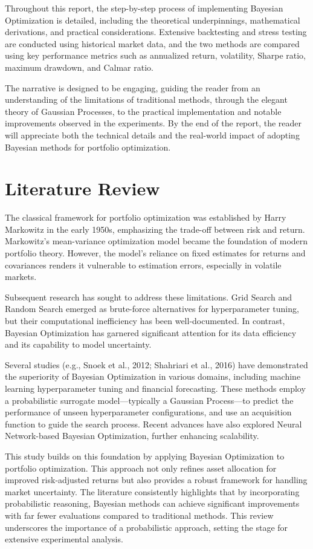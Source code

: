 \documentclass[a4paper,12pt]{article}
\begin{document}
Throughout this report, the step-by-step process of implementing Bayesian Optimization is detailed, including the theoretical underpinnings, mathematical derivations, and practical considerations. Extensive backtesting and stress testing are conducted using historical market data, and the two methods are compared using key performance metrics such as annualized return, volatility, Sharpe ratio, maximum drawdown, and Calmar ratio.

The narrative is designed to be engaging, guiding the reader from an understanding of the limitations of traditional methods, through the elegant theory of Gaussian Processes, to the practical implementation and notable improvements observed in the experiments. By the end of the report, the reader will appreciate both the technical details and the real-world impact of adopting Bayesian methods for portfolio optimization.

\section{Literature Review}
The classical framework for portfolio optimization was established by Harry Markowitz in the early 1950s, emphasizing the trade-off between risk and return. Markowitz’s mean-variance optimization model became the foundation of modern portfolio theory. However, the model's reliance on fixed estimates for returns and covariances renders it vulnerable to estimation errors, especially in volatile markets.

Subsequent research has sought to address these limitations. Grid Search and Random Search emerged as brute-force alternatives for hyperparameter tuning, but their computational inefficiency has been well-documented. In contrast, Bayesian Optimization has garnered significant attention for its data efficiency and its capability to model uncertainty.

Several studies (e.g., Snoek et al., 2012; Shahriari et al., 2016) have demonstrated the superiority of Bayesian Optimization in various domains, including machine learning hyperparameter tuning and financial forecasting. These methods employ a probabilistic surrogate model---typically a Gaussian Process---to predict the performance of unseen hyperparameter configurations, and use an acquisition function to guide the search process. Recent advances have also explored Neural Network-based Bayesian Optimization, further enhancing scalability.

This study builds on this foundation by applying Bayesian Optimization to portfolio optimization. This approach not only refines asset allocation for improved risk-adjusted returns but also provides a robust framework for handling market uncertainty. The literature consistently highlights that by incorporating probabilistic reasoning, Bayesian methods can achieve significant improvements with far fewer evaluations compared to traditional methods. This review underscores the importance of a probabilistic approach, setting the stage for extensive experimental analysis.
\end{document}
